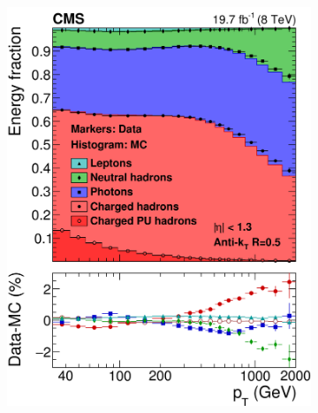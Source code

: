 \begin{figure}
    \begin{subfigure}{0.5\linewidth}
    \centering
    \includegraphics[width=\linewidth]{Chapitre4/Images/PFJetPT.png} 
    \caption*{} 
    \end{subfigure}
    \begin{subfigure}{0.5\linewidth}
    \centering

\end{subfigure}
\end{figure}
